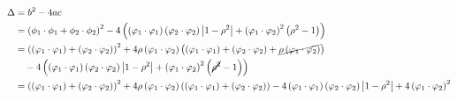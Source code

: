 \documentclass[11pt]{article}
\begin{document}
\begin{align*}
\Delta &= b^2 - 4ac \\
  &= \left( \phi_1 \cdot \phi_1 + \phi_2 \cdot \phi_2 \right)^2 - 4 \left( \left( \varphi_1\cdot\varphi_1 \right) \left( \varphi_2\cdot\varphi_2 \right) \left| 1 - \rho^2 \right| + \left( \varphi_1\cdot\varphi_2 \right)^2 \left( \rho^2 - 1 \right) \right) \\
  &= \left( \left( \varphi_1\cdot\varphi_1 \right) + \left( \varphi_2\cdot\varphi_2 \right) \right)^2 + 4 \rho \left( \varphi_1\cdot\varphi_2 \right) \left( \left( \varphi_1\cdot\varphi_1 \right) + \left( \varphi_2\cdot\varphi_2 \right) + \cancel{\rho \left( \varphi_1\cdot\varphi_2 \right)} \right) \\
    & \quad - 4 \left( \left( \varphi_1\cdot\varphi_1 \right) \left( \varphi_2\cdot\varphi_2 \right) \left| 1 - \rho^2 \right| + \left( \varphi_1\cdot\varphi_2 \right)^2 \left( \cancel{\rho^2} - 1 \right) \right) \\
  &= \left( \left( \varphi_1\cdot\varphi_1 \right) + \left( \varphi_2\cdot\varphi_2 \right) \right)^2 + 4 \rho \left( \varphi_1\cdot\varphi_2 \right) \left( \left( \varphi_1\cdot\varphi_1 \right) + \left( \varphi_2\cdot\varphi_2 \right) \right) - 4 \left( \varphi_1\cdot\varphi_1 \right) \left( \varphi_2\cdot\varphi_2 \right) \left| 1 - \rho^2 \right| + 4 \left( \varphi_1\cdot\varphi_2 \right)^2 \\
\end{align*}
\end{document}

